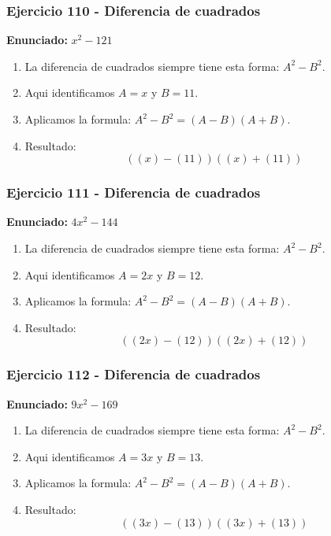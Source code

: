 \documentclass[11pt,a4paper]{article}
\begin{document}
\vspace{0.2cm}
\subsubsection*{Ejercicio 110 - Diferencia de cuadrados}
\textbf{Enunciado:} $ x^{2} - 121 $\par
\begin{enumerate}[leftmargin=2em]
\item La diferencia de cuadrados siempre tiene esta forma: \(A^2-B^2\).
\item Aqui identificamos \(A=x\) y \(B=11\).
\item Aplicamos la formula: \(A^2-B^2=(A-B)(A+B)\).
\item Resultado: \[\boxed{\left(\left(x\right)-\left(11\right)\right)\left(\left(x\right)+\left(11\right)\right)}\]
\end{enumerate}

\vspace{0.2cm}
\subsubsection*{Ejercicio 111 - Diferencia de cuadrados}
\textbf{Enunciado:} $ 4 x^{2} - 144 $\par
\begin{enumerate}[leftmargin=2em]
\item La diferencia de cuadrados siempre tiene esta forma: \(A^2-B^2\).
\item Aqui identificamos \(A=2 x\) y \(B=12\).
\item Aplicamos la formula: \(A^2-B^2=(A-B)(A+B)\).
\item Resultado: \[\boxed{\left(\left(2 x\right)-\left(12\right)\right)\left(\left(2 x\right)+\left(12\right)\right)}\]
\end{enumerate}

\vspace{0.2cm}
\subsubsection*{Ejercicio 112 - Diferencia de cuadrados}
\textbf{Enunciado:} $ 9 x^{2} - 169 $\par
\begin{enumerate}[leftmargin=2em]
\item La diferencia de cuadrados siempre tiene esta forma: \(A^2-B^2\).
\item Aqui identificamos \(A=3 x\) y \(B=13\).
\item Aplicamos la formula: \(A^2-B^2=(A-B)(A+B)\).
\item Resultado: \[\boxed{\left(\left(3 x\right)-\left(13\right)\right)\left(\left(3 x\right)+\left(13\right)\right)}\]
\end{enumerate}
\end{document}

